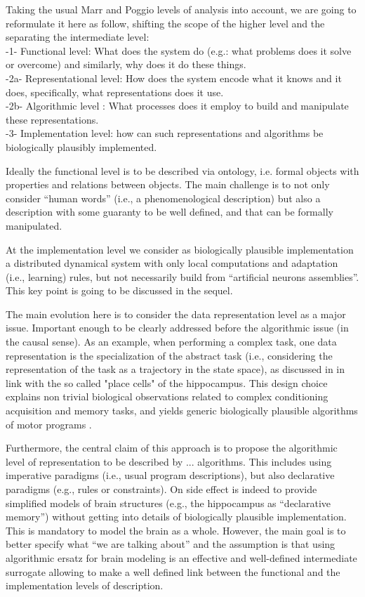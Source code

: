\documentclass[a4,12pt,twoside]{article}
\begin{document}
Taking the usual Marr and Poggio levels of analysis \cite{marr1976understanding} into account, we are going to reformulate it here as follow, shifting the scope of the higher level and the separating the intermediate level:
\\ -1- Functional level: What does the system do (e.g.: what problems does it solve or overcome) and similarly, why does it do these things.
\\ -2a- Representational level: How does the system encode what it knows and it does, specifically, what representations does it use.
\\ -2b- Algorithmic level : What processes does it employ to build and manipulate these representations.
\\ -3- Implementation level: how can such representations and algorithms be biologically plausibly implemented.

Ideally the functional level is to be described via ontology, i.e. formal objects with properties and relations between objects. The main challenge is to not only consider ``human words'' (i.e., a phenomenological description) but also a description with some guaranty to be well defined, and that can be formally manipulated. 

At the implementation level we consider as biologically plausible implementation a distributed dynamical system with only local computations and adaptation (i.e., learning) rules, but not necessarily build from ``artificial neurons assemblies''. This key point is going to be discussed in the sequel.

The main evolution here is to consider the data representation level as a major issue. Important enough to be clearly addressed before the algorithmic issue (in the causal sense). As an example, when performing a complex task, one data representation is the specialization of the abstract task (i.e., considering the representation of the task as a trajectory in the state space), as discussed in \cite{gaussier-revel-etal:02} in link with the so called "place cells" of the hippocampus. This design choice explains non trivial biological observations related to complex conditioning acquisition and memory tasks, and yields generic biologically plausible algorithms of motor programs \cite{connolly-grupen:93,connolly-burns:93,vieville:06e}.
 
Furthermore, the central claim of this approach is to propose the algorithmic level of representation to be described by ... algorithms. This includes using imperative paradigms (i.e., usual program descriptions), but also declarative paradigms (e.g., rules or constraints). On side effect is indeed to provide simplified models of brain structures (e.g., the hippocampus as ``declarative memory'') without getting into details of biologically plausible implementation. This is mandatory to model the brain as a whole. However, the main goal is to better specify what ``we are talking about'' and the assumption is that using algorithmic ersatz for brain modeling is an effective and well-defined intermediate surrogate allowing to make a well defined link between the functional and the implementation levels of description. 
\end{document}
